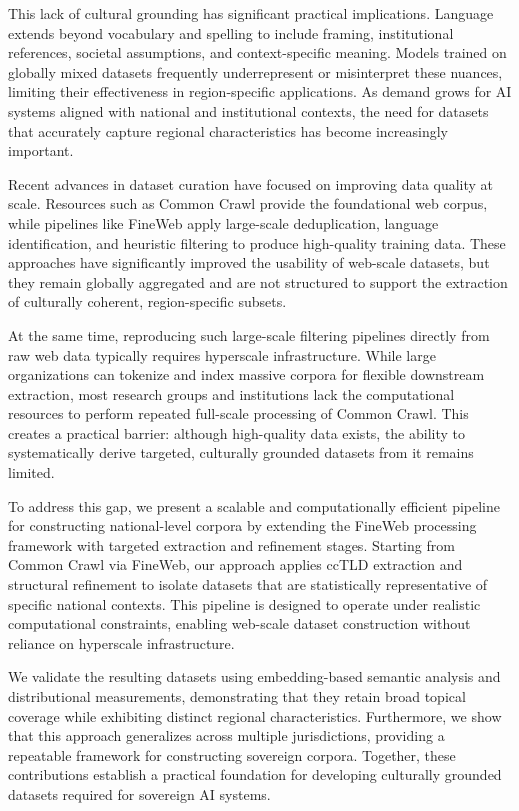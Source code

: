 \documentclass[11pt, a4paper]{article}
\begin{document}
This lack of cultural grounding has significant practical implications. Language extends beyond vocabulary and spelling to include framing, institutional references, societal assumptions, and context-specific meaning. Models trained on globally mixed datasets frequently underrepresent or misinterpret these nuances, limiting their effectiveness in region-specific applications. As demand grows for AI systems aligned with national and institutional contexts, the need for datasets that accurately capture regional characteristics has become increasingly important.

Recent advances in dataset curation have focused on improving data quality at scale. Resources such as Common Crawl provide the foundational web corpus, while pipelines like FineWeb apply large-scale deduplication, language identification, and heuristic filtering to produce high-quality training data. These approaches have significantly improved the usability of web-scale datasets, but they remain globally aggregated and are not structured to support the extraction of culturally coherent, region-specific subsets.

At the same time, reproducing such large-scale filtering pipelines directly from raw web data typically requires hyperscale infrastructure. While large organizations can tokenize and index massive corpora for flexible downstream extraction, most research groups and institutions lack the computational resources to perform repeated full-scale processing of Common Crawl. This creates a practical barrier: although high-quality data exists, the ability to systematically derive targeted, culturally grounded datasets from it remains limited.

To address this gap, we present a scalable and computationally efficient pipeline for constructing national-level corpora by extending the FineWeb processing framework with targeted extraction and refinement stages. Starting from Common Crawl via FineWeb, our approach applies ccTLD extraction and structural refinement to isolate datasets that are statistically representative of specific national contexts. This pipeline is designed to operate under realistic computational constraints, enabling web-scale dataset construction without reliance on hyperscale infrastructure.

We validate the resulting datasets using embedding-based semantic analysis and distributional measurements, demonstrating that they retain broad topical coverage while exhibiting distinct regional characteristics. Furthermore, we show that this approach generalizes across multiple jurisdictions, providing a repeatable framework for constructing sovereign corpora. Together, these contributions establish a practical foundation for developing culturally grounded datasets required for sovereign AI systems.
\end{document}

